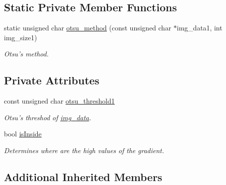 \subsection*{Static Private Member Functions}
\begin{DoxyCompactItemize}
\item 
\hypertarget{classofeli_1_1_geodesic_a_c_afab80d244aaf8d50902c9bb0de207bf2}{static unsigned char \hyperlink{classofeli_1_1_geodesic_a_c_afab80d244aaf8d50902c9bb0de207bf2}{otsu\-\_\-method} (const unsigned char $\ast$img\-\_\-data1, int img\-\_\-size1)}\label{classofeli_1_1_geodesic_a_c_afab80d244aaf8d50902c9bb0de207bf2}

\begin{DoxyCompactList}\small\item\em Otsu's method. \end{DoxyCompactList}\end{DoxyCompactItemize}
\subsection*{Private Attributes}
\begin{DoxyCompactItemize}
\item 
\hypertarget{classofeli_1_1_geodesic_a_c_a1cde491f4e294413d5897e09fa0d3a39}{const unsigned char \hyperlink{classofeli_1_1_geodesic_a_c_a1cde491f4e294413d5897e09fa0d3a39}{otsu\-\_\-threshold1}}\label{classofeli_1_1_geodesic_a_c_a1cde491f4e294413d5897e09fa0d3a39}

\begin{DoxyCompactList}\small\item\em Otsu's threshod of \hyperlink{classofeli_1_1_active_contour_a96480d79e9a60817925903da233a5b1e}{img\-\_\-data}. \end{DoxyCompactList}\item 
\hypertarget{classofeli_1_1_geodesic_a_c_ada6b8ca4769ee7a03b0f47da3cbabc05}{bool \hyperlink{classofeli_1_1_geodesic_a_c_ada6b8ca4769ee7a03b0f47da3cbabc05}{is\-Inside}}\label{classofeli_1_1_geodesic_a_c_ada6b8ca4769ee7a03b0f47da3cbabc05}

\begin{DoxyCompactList}\small\item\em Determines where are the high values of the gradient. \end{DoxyCompactList}\end{DoxyCompactItemize}
\subsection*{Additional Inherited Members}


